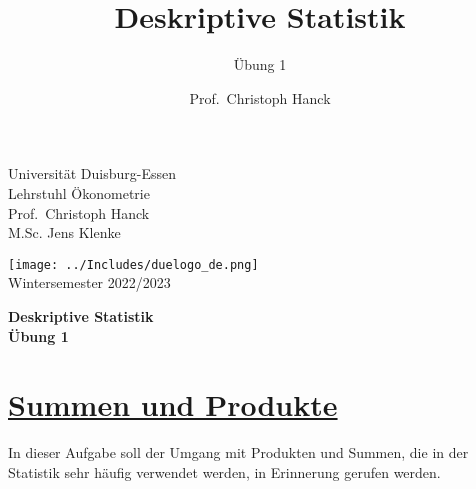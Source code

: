 \documentclass[12pt,a4paper]{article}
\title{Deskriptive Statistik}
\subtitle{Übung 1}
\author{Prof.~Christoph Hanck}
\date{}
\newcommand{\tmpsection}[1]{}
\let\tmpsection=\section
\renewcommand{\section}[1]{\tmpsection{\underline{#1}} }
\begin{document}





\restoregeometry



\begin{minipage}{0.6\textwidth}
Universität Duisburg-Essen\\
Lehrstuhl Ökonometrie\\
Prof.~Christoph Hanck \\
M.Sc. Jens Klenke \\
\end{minipage}

	\begin{flushright}
	\vspace{-3.55cm}
	\texttt{[image: ../Includes/duelogo\_de.png]}\\
	\vspace{.125cm}
	Wintersemester 2022/2023
	\end{flushright}


\begin{center}
	\vspace{.25cm}
	\textbf{\Large{Deskriptive Statistik}}\\
	\vspace{.25cm}
	\textbf{\large{Übung 1}}\\
	\vspace{.125cm}
\end{center}





\hypertarget{summen-und-produkte}{%
\section{Summen und Produkte}\label{summen-und-produkte}}

In dieser Aufgabe soll der Umgang mit Produkten und Summen, die in der
Statistik sehr häufig verwendet werden, in Erinnerung gerufen werden.
\end{document}
